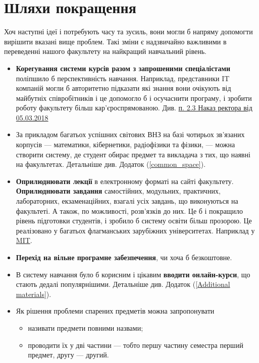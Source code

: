 \documentclass[14pt, a4paper]{extarticle}  %
\begin{document}
\newpage
\section{Шляхи покращення}

Хоч наступні ідеї і потребують часу та зусиль, вони могли б напряму допомогти  вирішити вказані вище проблем. Такі зміни є надзвичайно важливими в переведенні нашого факультету на найкращий навчальний рівень.

\begin{itemize}
    \item  \textbf{Корегування системи курсів разом з  запрошеними спеціалістами} поліпшило б перспективність навчання. Наприклад, представники IT компаній могли б авторитетно підказати які знання вони очікують від майбутніх співробітників і це допомогло б і осучаснити програму, і зробити роботу факультету більш кар'єроспрямо\-ваною. Див. \href{http://nmc.univ.kiev.ua/docs/Poryadok_OP.pdf}{п. 2.3 Наказ ректора від 05.03.2018}
    
    \item За прикладом багатьох успішних світових ВНЗ на базі чотирьох зв'язаних корпусів --- математики, кібернетики, радіофізики та фізики, --- можна створити систему, де студент обирає предмет та викладача з тих, що наявні на факультетах. Детальніше див. Додаток (\ref{common_space}).
    
    \item  \textbf{Оприлюднювати лекції} в електронному форматі на сайті факультету.
     \textbf{Оприлюднювати завдання} самостійних, модульних, практичних, лабораторних, екзаменаційних, взагалі усіх завдань, що виконуються на факультеті. А також, по можливості, розв'язків до них. Це б і покращило рівень підготовки студентів, і зробило б систему освіти більш прозорою. Це реалізовано у багатьох флагманських зарубіжних університетах. Наприклад у \href{https://ocw.mit.edu/index.htm}{MIT}.
    
    \item \textbf{Перехід на вільне програмне забезпечення}, чи хоча б безкоштовне.
    
    \item В систему навчання було б корисним і цікавим \textbf{вводити онлайн-курси}, що стають дедалі популярнішими. Детальніше див. Додаток (\ref{Additional materials}).
    
    \item Як рішення проблеми спарених предметів можна запропонувати
    \begin{itemize}
        \item називати предмети повними назвами;
        \item проводити їх у дві частини --- тобто першу частину семестра перший предмет, другу --- другий.
    \end{itemize}
\end{itemize}
\end{document}
